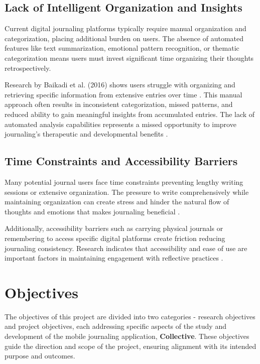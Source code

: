 \subsection{Lack of Intelligent Organization and Insights}\label{subsec:lack-intelligence}

Current digital journaling platforms typically require manual organization and categorization, placing additional burden on users. The absence of automated features like text summarization, emotional pattern recognition, or thematic categorization means users must invest significant time organizing their thoughts retrospectively.

Research by Baikadi et al. (2016) shows users struggle with organizing and retrieving specific information from extensive entries over time \cite{baikadi2016exploring}. This manual approach often results in inconsistent categorization, missed patterns, and reduced ability to gain meaningful insights from accumulated entries. The lack of automated analysis capabilities represents a missed opportunity to improve journaling's therapeutic and developmental benefits \cite{allahyari2017text}.

\subsection{Time Constraints and Accessibility Barriers}\label{subsec:time-constraints}

Many potential journal users face time constraints preventing lengthy writing sessions or extensive organization. The pressure to write comprehensively while maintaining organization can create stress and hinder the natural flow of thoughts and emotions that makes journaling beneficial \cite{pennebaker1999forming}.

Additionally, accessibility barriers such as carrying physical journals or remembering to access specific digital platforms create friction reducing journaling consistency. Research indicates that accessibility and ease of use are important factors in maintaining engagement with reflective practices \cite{sloan2015efficacy}.

\section{Objectives}\label{sec:objectives}

The objectives of this project are divided into two categories - research objectives and project objectives, each addressing specific aspects of the study and development of the mobile journaling application, \textbf{Collective}. These objectives guide the direction and scope of the project, ensuring alignment with its intended purpose and outcomes.

